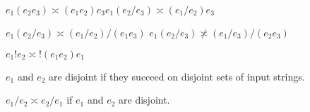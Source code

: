 \begin{frame}

	
	$e_1(e_2e_3) \asymp (e_1e_2)e_3$\hfill $e_1(e_2 / e_3) \asymp (e_1 / e_2)e_3$
		
		
		
		$e_1(e_2 / e_3) \asymp (e_1/ e_2) / (e_1e_3)$  	\hfill $e_1(e_2 / e_3) \not\asymp (e_1/ e_3) / (e_2e_3)$
		
	

		
	$ e_1!e_2 \asymp   !(e_1e_2)e_1$ \hfill
	
	  $e_1$ and $e_2$ are disjoint if they succeed on disjoint sets of input strings.
	
	$e_1 / e_2 \asymp  e_2 / e_1$ if  $e_1$ and $e_2$ are disjoint.
	

	
\end{frame}